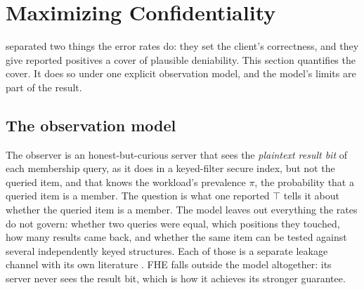 %

\section{Maximizing Confidentiality}
\label{sec:maximizing-confidentiality}

 separated two things the error rates do: they
set the client's correctness, and they give reported positives a cover of
plausible deniability. This section quantifies the cover. It does so
under one explicit observation model, and the model's limits are part of
the result.

\subsection*{The observation model}

The observer is an honest-but-curious server that sees the
\emph{plaintext result bit} of each membership query, as it does in a
keyed-filter secure index, but not the queried item, and that knows the
workload's prevalence $\pi$, the probability that a queried item is a
member. The question is what one reported $\top$ tells it about whether
the queried item is a member. The model leaves out everything the rates
do not govern: whether two queries were equal, which positions they
touched, how many results came back, and whether the same item can be
tested against several independently keyed structures. Each of those is a
separate leakage channel with its own literature
\parencite{curtmola-et-al-2006,cash-et-al-2015,kamara-moataz-ohrimenko-2018}.
FHE falls outside the model altogether: its server never sees the result
bit, which is how it achieves its stronger guarantee.

